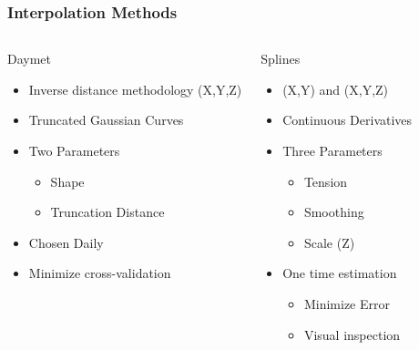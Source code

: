 \documentclass{beamer}
\begin{document}
\begin{frame}
  \frametitle{Interpolation Methods}
  \begin{columns}
    \begin{block}{Daymet}
      \begin{itemize}
      \item Inverse distance methodology (X,Y,Z)
      \item Truncated Gaussian Curves
      \item Two Parameters
        \begin{itemize}
        \item Shape
        \item Truncation Distance
        \end{itemize}
      \item Chosen Daily
      \item Minimize cross-validation
      \end{itemize}
    \end{block}
    \begin{block}{Splines}
      \begin{itemize}
      \item (X,Y) and (X,Y,Z)
      \item Continuous Derivatives
      \item Three Parameters
        \begin{itemize}
        \item Tension
        \item Smoothing
        \item Scale (Z)
        \end{itemize}
      \item One time estimation
        \begin{itemize}
        \item Minimize Error
        \item Visual inspection
        \end{itemize}
      \end{itemize}
    \end{block}
  \end{columns}
\end{frame}
\end{document}
